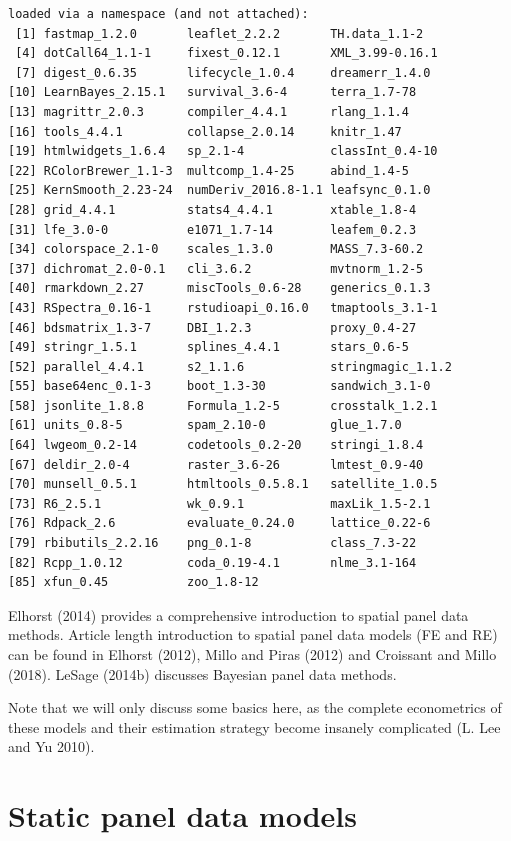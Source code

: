 \documentclass[
  letterpaper,
]{scrbook}
\begin{document}
\begin{verbatim}
loaded via a namespace (and not attached):
 [1] fastmap_1.2.0       leaflet_2.2.2       TH.data_1.1-2      
 [4] dotCall64_1.1-1     fixest_0.12.1       XML_3.99-0.16.1    
 [7] digest_0.6.35       lifecycle_1.0.4     dreamerr_1.4.0     
[10] LearnBayes_2.15.1   survival_3.6-4      terra_1.7-78       
[13] magrittr_2.0.3      compiler_4.4.1      rlang_1.1.4        
[16] tools_4.4.1         collapse_2.0.14     knitr_1.47         
[19] htmlwidgets_1.6.4   sp_2.1-4            classInt_0.4-10    
[22] RColorBrewer_1.1-3  multcomp_1.4-25     abind_1.4-5        
[25] KernSmooth_2.23-24  numDeriv_2016.8-1.1 leafsync_0.1.0     
[28] grid_4.4.1          stats4_4.4.1        xtable_1.8-4       
[31] lfe_3.0-0           e1071_1.7-14        leafem_0.2.3       
[34] colorspace_2.1-0    scales_1.3.0        MASS_7.3-60.2      
[37] dichromat_2.0-0.1   cli_3.6.2           mvtnorm_1.2-5      
[40] rmarkdown_2.27      miscTools_0.6-28    generics_0.1.3     
[43] RSpectra_0.16-1     rstudioapi_0.16.0   tmaptools_3.1-1    
[46] bdsmatrix_1.3-7     DBI_1.2.3           proxy_0.4-27       
[49] stringr_1.5.1       splines_4.4.1       stars_0.6-5        
[52] parallel_4.4.1      s2_1.1.6            stringmagic_1.1.2  
[55] base64enc_0.1-3     boot_1.3-30         sandwich_3.1-0     
[58] jsonlite_1.8.8      Formula_1.2-5       crosstalk_1.2.1    
[61] units_0.8-5         spam_2.10-0         glue_1.7.0         
[64] lwgeom_0.2-14       codetools_0.2-20    stringi_1.8.4      
[67] deldir_2.0-4        raster_3.6-26       lmtest_0.9-40      
[70] munsell_0.5.1       htmltools_0.5.8.1   satellite_1.0.5    
[73] R6_2.5.1            wk_0.9.1            maxLik_1.5-2.1     
[76] Rdpack_2.6          evaluate_0.24.0     lattice_0.22-6     
[79] rbibutils_2.2.16    png_0.1-8           class_7.3-22       
[82] Rcpp_1.0.12         coda_0.19-4.1       nlme_3.1-164       
[85] xfun_0.45           zoo_1.8-12         
\end{verbatim}

Elhorst (2014) provides a comprehensive introduction to spatial panel
data methods. Article length introduction to spatial panel data models
(FE and RE) can be found in Elhorst (2012), Millo and Piras (2012) and
Croissant and Millo (2018). LeSage (2014b) discusses Bayesian panel data
methods.

Note that we will only discuss some basics here, as the complete
econometrics of these models and their estimation strategy become
insanely complicated (L. Lee and Yu 2010).

\hypertarget{static-panel-data-models}{%
\section{Static panel data models}\label{static-panel-data-models}}
\end{document}
